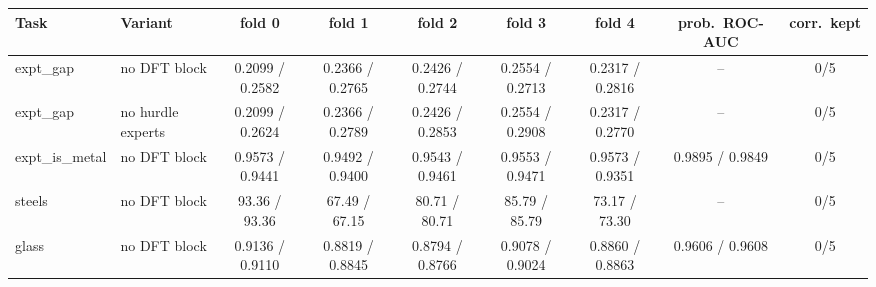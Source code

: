 \begin{tabular}{llccccccc}
\toprule
Task & Variant & fold 0 & fold 1 & fold 2 & fold 3 & fold 4 & prob.\ ROC-AUC & corr.\ kept \\
\midrule
expt\_gap & no DFT block & 0.2099 / 0.2582 & 0.2366 / 0.2765 & 0.2426 / 0.2744 & 0.2554 / 0.2713 & 0.2317 / 0.2816 & -- & 0/5 \\
expt\_gap & no hurdle experts & 0.2099 / 0.2624 & 0.2366 / 0.2789 & 0.2426 / 0.2853 & 0.2554 / 0.2908 & 0.2317 / 0.2770 & -- & 0/5 \\
expt\_is\_metal & no DFT block & 0.9573 / 0.9441 & 0.9492 / 0.9400 & 0.9543 / 0.9461 & 0.9553 / 0.9471 & 0.9573 / 0.9351 & 0.9895 / 0.9849 & 0/5 \\
steels & no DFT block & 93.36 / 93.36 & 67.49 / 67.15 & 80.71 / 80.71 & 85.79 / 85.79 & 73.17 / 73.30 & -- & 0/5 \\
glass & no DFT block & 0.9136 / 0.9110 & 0.8819 / 0.8845 & 0.8794 / 0.8766 & 0.9078 / 0.9024 & 0.8860 / 0.8863 & 0.9606 / 0.9608 & 0/5 \\
\bottomrule
\end{tabular}
